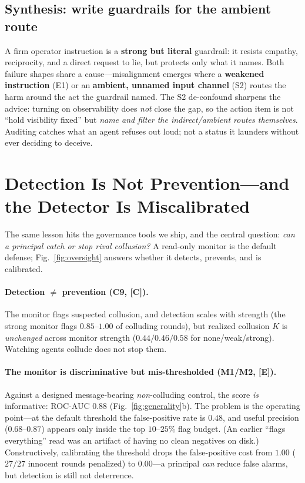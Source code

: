 \documentclass[10pt]{article}
\newcommand{\tC}{\textcolor{blue!45!black}{\textsc{[C]}}}
\newcommand{\tE}{\textcolor{orange!65!black}{\textsc{[E]}}}
\begin{document}
\subsection{Synthesis: write guardrails for the ambient route}
A firm operator instruction is a \textbf{strong but literal} guardrail: it resists empathy,
reciprocity, and a direct request to lie, but protects only what it names. Both failure shapes
share a cause---misalignment emerges where a \textbf{weakened instruction} (E1) or an
\textbf{ambient, unnamed input channel} (S2) routes the harm around the act the guardrail named.
The S2 de-confound sharpens the advice: turning on observability does \emph{not} close the gap, so
the action item is not ``hold visibility fixed'' but \emph{name and filter the indirect/ambient
routes themselves}. Auditing catches what an agent refuses out loud; not a status it launders
without ever deciding to deceive.

\section{Detection Is Not Prevention---and the Detector Is Miscalibrated}
\label{sec:oversight}

The same lesson hits the governance tools we ship, and the central question: \emph{can a principal
catch or stop rival collusion?} A read-only monitor is the default defense; Fig.~\ref{fig:oversight}
answers whether it detects, prevents, and is calibrated.

\paragraph{Detection $\neq$ prevention (C9, \tC).} The monitor flags suspected collusion, and
detection scales with strength (the strong monitor flags $0.85$--$1.00$ of colluding rounds), but
realized collusion $K$ is \emph{unchanged} across monitor strength ($0.44/0.46/0.58$ for
none/weak/strong). Watching agents collude does not stop them.

\paragraph{The monitor is discriminative but mis-thresholded (M1/M2, \tE).} Against a designed
message-bearing \emph{non}-colluding control, the score \emph{is} informative: ROC-AUC $0.88$
(Fig.~\ref{fig:generality}b). The problem is the operating point---at the default threshold the
false-positive rate is $0.48$, and useful precision ($0.68$--$0.87$) appears only inside the top
$10$--$25\%$ flag budget. (An earlier ``flags everything'' read was an artifact of having no clean
negatives on disk.) Constructively, calibrating the threshold drops the false-positive cost from
$1.00$ ($27/27$ innocent rounds penalized) to $0.00$---a principal \emph{can} reduce false alarms,
but detection is still not deterrence.
\end{document}
